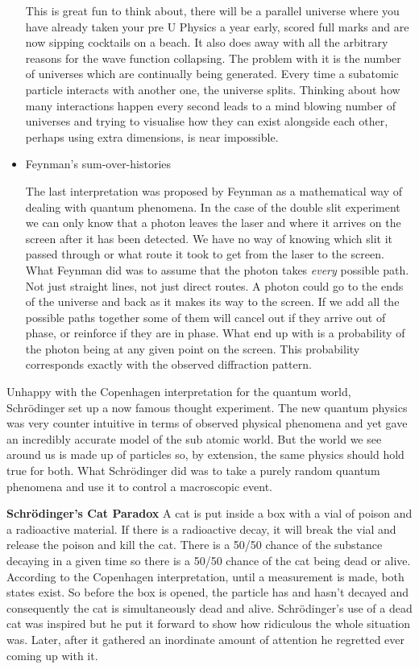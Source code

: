 \documentclass[main.tex]{subfiles}
\begin{document}
\begin{itemize}
This is great fun to think about, there will be a parallel universe where you have already taken your pre U Physics a year early, scored full marks and are now sipping cocktails on a beach. It also does away with all the arbitrary reasons for the wave function collapsing. The problem with it is the number of universes which are continually being generated. Every time a subatomic particle interacts with another one, the universe splits. Thinking about how many interactions happen every second leads to a mind blowing number of universes and trying to visualise how they can exist alongside each other, perhaps using extra dimensions, is near impossible. 


\item Feynman's sum-over-histories

The last interpretation was proposed by Feynman as a mathematical way of dealing with quantum phenomena. In the case of the double slit experiment we can only know that a photon leaves the laser and where it arrives on the screen after it has been detected. We have no way of knowing which slit it passed through or what route it took to get from the laser to the screen. What Feynman did was to assume that the photon takes \emph{every} possible path. Not just straight lines, not just direct routes. A photon could go to the ends of the universe and back as it makes its way to the screen. If we add all the possible paths together some of them will cancel out if they arrive out of phase, or reinforce if they are in phase. What end up with is a probability of the photon being at any given point on the screen. This probability corresponds exactly with the observed diffraction pattern. 


\end{itemize}

Unhappy with the Copenhagen interpretation for the quantum world, Schrödinger set up a now famous thought experiment. The new quantum physics was very counter intuitive in terms of observed physical phenomena and yet gave an incredibly accurate model of the sub atomic world. But the world we see around us is made up of particles so, by extension, the same physics should hold true for both. What Schrödinger did was to take a purely random quantum phenomena and use it to control a macroscopic event.

\textbf{Schrödinger's Cat Paradox}
A cat is put inside a box with a vial of poison and a radioactive material. If there is a radioactive decay, it will break the vial and release the poison and kill the cat. There is a 50/50 chance of the substance decaying in a given time so there is a 50/50 chance of the cat being dead or alive. According to the Copenhagen interpretation, until a measurement is made, both states exist. So before the box is opened, the particle has and hasn't decayed and consequently the cat is simultaneously dead and alive. Schrödinger's use of a dead cat was inspired but he put it forward to show how ridiculous the whole situation was. Later, after it gathered an inordinate amount of attention he regretted ever coming up with it.
\end{document}
